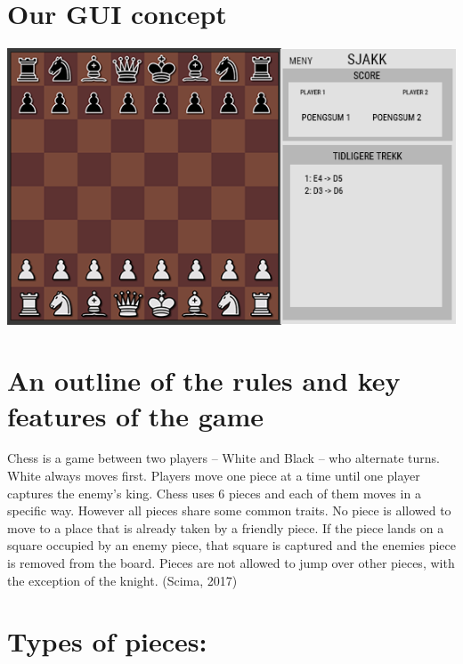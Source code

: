 \documentclass{article}
\begin{document}
    \section{Our GUI concept}
    \includegraphics[scale=0.6]{mockup_chess.png}
    
    
    \section{An outline of the rules and key features of the game}
    \noindent
    Chess is a game between two players  -- White and Black -- who alternate turns. White always moves first. Players move one piece at a time until one player captures the enemy's king.  Chess uses 6 pieces and each of them moves in a specific way. However all pieces share some common traits. No piece is allowed to move to a place that is already taken by a friendly piece. If the piece lands on a square occupied by an enemy piece, that square is captured and the enemies piece is removed from the board. Pieces are not allowed to jump over other pieces, with the exception of the knight. (Scima, 2017)

\section{Types of pieces:}
\end{document}
